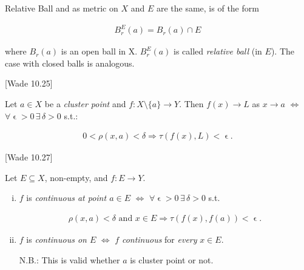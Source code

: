 \documentclass[10pt]{article} %
\newcommand{\cw}[1]{[Wade #1]}
\begin{document}
\begin{multicols}{3}
\begin{definition}{}{Relative Ball}
    and as metric on $X$ and $E$ are the same, is of the form

        \begin{align*}
            B_r^E(a) = B_r(a) \cap E
        \end{align*}

    where $B_r(a)$ is an open ball in X. $B_r^E(a)$ is called \emph{relative ball} (in $E$). The case with closed balls is analogous.

\end{definition}

\begin{definition}{\cw{10.25}}{}

    Let $a \in X$ be a \emph{cluster point} and $f: X \setminus \{a\} \to Y$. Then $f(x) \to L$ as $x \to a$ $\Leftrightarrow$ $\forall \upvarepsilon > 0 \, \exists \, \delta > 0$ s.t.:

        \begin{align*}
            0 < \rho(x,a) < \delta \Rightarrow \tau(f(x),L) < \upvarepsilon.
        \end{align*}

\end{definition}

\begin{definition}{\cw{10.27}}{}

    Let $E \subseteq X$, non-empty, and $f: E \to Y$.

        \begin{enumerate}[i)]
            \setlength{\parskip}{0em}
            \item $f$ is \emph{continuous at point $a \in E$} $\Leftrightarrow$ $\forall \upvarepsilon > 0 \, \exists \, \delta > 0$ s.t.

                \begin{align*}
                    \rho(x,a) < \delta \textrm{ and } x \in E \Rightarrow \tau(f(x),f(a)) < \upvarepsilon.
                \end{align*}

            \item $f$ is \emph{continuous on $E$} $\Leftrightarrow$ $f$ \emph{continuous} for \emph{every} $x \in E$.

            N.B.: This is valid whether $a$ is cluster point or not.
        \end{enumerate}

\end{definition}


\end{multicols}
\end{document}
